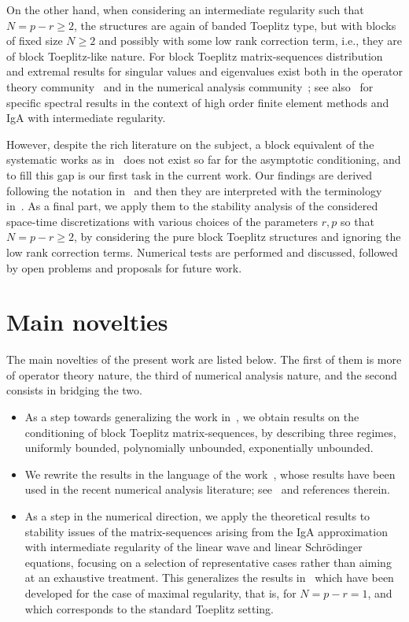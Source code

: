 \documentclass[addpoints,12pt,letter]{article}
\renewcommand{\ge}{\geqslant}
\numberwithin{equation}{section}
\theoremstyle{definition}
\begin{document}
On the other hand, when considering an intermediate regularity such that $N=p-r\ge 2$, the structures are again of banded Toeplitz type, but with blocks of fixed size $N\ge 2$ and possibly with some low rank correction term, i.e., they are of block Toeplitz-like nature.
For block Toeplitz matrix-sequences distribution and extremal results for singular values and eigenvalues exist both in the operator theory community~\cite{Goh1,Goh2,Goh3,WiBlo3,WiBlo2,WiBlo1} and in the numerical analysis community~\cite{BaGa20b,BaGa20a,DoNeySe12,Se99e,Se99f,SeTi99,Ti98a};
see also~\cite{GaSe15,GaSp19} for specific spectral results in the context of high order finite element methods and IgA with intermediate regularity.

However, despite the rich literature on the subject, a block equivalent of the systematic works as in~\cite{AmoBru96,BoGr99} does not exist so far for the asymptotic conditioning, and to fill this gap is our first task in the current work.
Our findings are derived following the notation in~\cite{BoGr99} and then they are interpreted with the terminology in~\cite{AmoBru96}.
As a final part, we apply them to the stability analysis of the considered space-time discretizations with various choices of the parameters $r, p$ so that $N=p-r\ge 2$, by considering the pure block Toeplitz structures and ignoring the low rank correction terms.
Numerical tests are performed and discussed, followed by open problems and proposals for future work.

\section*{Main novelties}

The main novelties of the present work are listed below.
The first of them is more of operator theory nature, the third of numerical analysis nature, and the second consists in bridging the two.
\begin{itemize}
\item As a step towards generalizing the work in~\cite{AmoBru96,BoGr99}, we obtain results on the conditioning of block Toeplitz matrix-sequences, by describing three regimes, uniformly bounded, polynomially unbounded, exponentially unbounded.
\item We rewrite the results in the language of the work~\cite{AmoBru96}, whose results have been used in the recent numerical analysis literature; see~\cite{FeFr26, FeFrLoPe25, FeGo25} and references therein.
\item As a step in the numerical direction, we apply the theoretical results to stability issues of the matrix-sequences arising from the IgA approximation with intermediate regularity of the linear wave and linear Schrödinger equations, focusing on a selection of representative cases rather than aiming at an exhaustive treatment. This generalizes the results in~\cite{FeFr26,FeGo25} which have been developed for the case of maximal regularity, that is, for $N=p-r=1$, and which corresponds to the standard Toeplitz setting.
\end{itemize}
\end{document}

